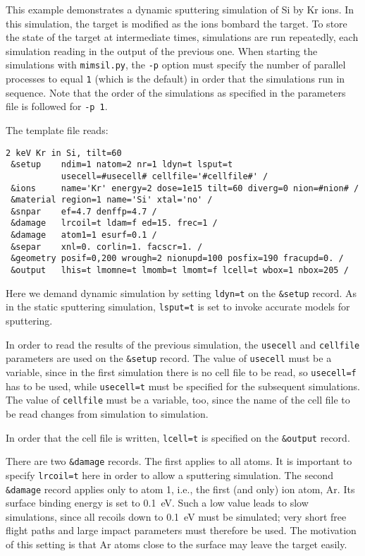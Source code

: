 This example demonstrates a dynamic sputtering simulation of Si by Kr ions. In
this simulation, the target is modified as the ions bombard the target. To store
the state of the target at intermediate times, simulations are run repeatedly,
each simulation reading in the output of the previous one. When starting the
simulations with \texttt{mimsil.py}, the \texttt{-p} option must specify the
number of parallel processes to equal \texttt{1} (which is the default) in
order that the simulations run in sequence. Note that the order of the
simulations as specified in the parameters file is followed for \texttt{-p 1}.

The template file reads:

\begin{verbatim}
2 keV Kr in Si, tilt=60
 &setup    ndim=1 natom=2 nr=1 ldyn=t lsput=t
           usecell=#usecell# cellfile='#cellfile#' /
 &ions     name='Kr' energy=2 dose=1e15 tilt=60 diverg=0 nion=#nion# /
 &material region=1 name='Si' xtal='no' /
 &snpar    ef=4.7 denffp=4.7 /
 &damage   lrcoil=t ldam=f ed=15. frec=1 /
 &damage   atom1=1 esurf=0.1 /
 &separ    xnl=0. corlin=1. facscr=1. /
 &geometry posif=0,200 wrough=2 nionupd=100 posfix=190 fracupd=0. /
 &output   lhis=t lmomne=t lmomb=t lmomt=f lcell=t wbox=1 nbox=205 /
\end{verbatim}

Here we demand dynamic simulation by setting \texttt{ldyn=t} on the
\texttt{\&setup} record. As in the static sputtering simulation,
\texttt{lsput=t} is set to invoke accurate models for sputtering.

In order to read the results of the previous simulation, the \texttt{usecell}
and \texttt{cellfile} parameters are used on the \texttt{\&setup} record. The
value of \texttt{usecell} must be a variable, since in the first simulation
there is no cell file to be read, so \texttt{usecell=f} has to be used, while
\texttt{usecell=t} must be specified for the subsequent simulations. The value
of \texttt{cellfile} must be a variable, too, since the name of the cell file to
be read changes from simulation to simulation.

In order that the cell file is written, \texttt{lcell=t} is specified on the
\texttt{\&output} record.

There are two \texttt{\&damage} records. The first applies to all atoms. It is
important to specify \texttt{lrcoil=t} here in order to allow a sputtering
simulation. The second \texttt{\&damage} record applies only to atom 1, i.e.,
the first (and only) ion atom, Ar. Its surface binding energy is set to
0.1~eV. Such a low value leads to slow simulations, since all recoils down to
0.1~eV must be simulated; very short free flight paths and large impact
parameters must therefore be used. The motivation of this setting is that Ar
atoms close to the surface may leave the target easily.

